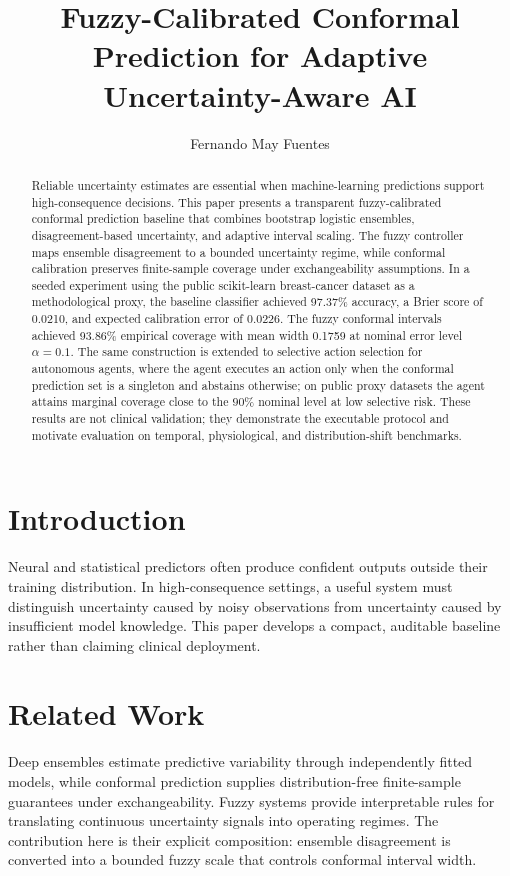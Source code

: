 \documentclass[sigconf]{acmart}
\title{Fuzzy-Calibrated Conformal Prediction for Adaptive Uncertainty-Aware AI}
\author{Fernando May Fuentes}
\affiliation{\institution{Instituto Politecnico Nacional, UPIITA}\city{Mexico City}\country{Mexico}}
\affiliation{\institution{Beihang University, School of Information and Communication Engineering}\city{Beijing}\country{China}}
\begin{document}
\begin{abstract}
Reliable uncertainty estimates are essential when machine-learning predictions support high-consequence decisions. This paper presents a transparent fuzzy-calibrated conformal prediction baseline that combines bootstrap logistic ensembles, disagreement-based uncertainty, and adaptive interval scaling. The fuzzy controller maps ensemble disagreement to a bounded uncertainty regime, while conformal calibration preserves finite-sample coverage under exchangeability assumptions. In a seeded experiment using the public scikit-learn breast-cancer dataset as a methodological proxy, the baseline classifier achieved 97.37\% accuracy, a Brier score of 0.0210, and expected calibration error of 0.0226. The fuzzy conformal intervals achieved 93.86\% empirical coverage with mean width 0.1759 at nominal error level $\alpha=0.1$. The same construction is extended to selective action selection for autonomous agents, where the agent executes an action only when the conformal prediction set is a singleton and abstains otherwise; on public proxy datasets the agent attains marginal coverage close to the $90\%$ nominal level at low selective risk. These results are not clinical validation; they demonstrate the executable protocol and motivate evaluation on temporal, physiological, and distribution-shift benchmarks.
\end{abstract}
\maketitle

\section{Introduction}
Neural and statistical predictors often produce confident outputs outside their training distribution. In high-consequence settings, a useful system must distinguish uncertainty caused by noisy observations from uncertainty caused by insufficient model knowledge. This paper develops a compact, auditable baseline rather than claiming clinical deployment.

\section{Related Work}
Deep ensembles estimate predictive variability through independently fitted models, while conformal prediction supplies distribution-free finite-sample guarantees under exchangeability. Fuzzy systems provide interpretable rules for translating continuous uncertainty signals into operating regimes. The contribution here is their explicit composition: ensemble disagreement is converted into a bounded fuzzy scale that controls conformal interval width.
\end{document}

